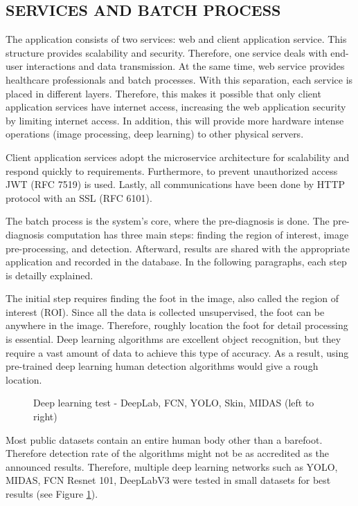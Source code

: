 \subsection{SERVICES AND BATCH PROCESS} \label{sec:StudyIServicesAndBatchProcess}
The application consists of two services: web and client application service. This structure provides scalability and security. Therefore, one service deals with end-user interactions and data transmission. At the same time, web service provides healthcare professionals and batch processes. With this separation, each service is placed in different layers. Therefore, this makes it possible that only client application services have internet access, increasing the web application security by limiting internet access.  In addition, this will provide more hardware intense operations (image processing, deep learning) to other physical servers. 

Client application services adopt the microservice architecture for scalability and respond quickly to requirements. Furthermore, to prevent unauthorized access JWT (RFC 7519) is used. Lastly, all communications have been done by HTTP protocol with an SSL (RFC 6101). 

The batch process is the system's core, where the pre-diagnosis is done. The pre-diagnosis computation has three main steps: finding the region of interest, image pre-processing, and detection. Afterward, results are shared with the appropriate application and recorded in the database. In the following paragraphs, each step is detailly explained.

The initial step requires finding the foot in the image, also called the region of interest (ROI).  Since all the data is collected unsupervised, the foot can be anywhere in the image. Therefore, roughly location the foot for detail processing is essential. Deep learning algorithms are excellent object recognition, but they require a vast amount of data to achieve this type of accuracy. As a result, using pre-trained deep learning human detection algorithms would give a rough location.

\begin{figure}[htbp]
\centering
{}
\caption{Deep learning test - DeepLab, FCN, YOLO, Skin, MIDAS (left to right)}
\label{fig:DeepLearningTest}
\end{figure}

Most public datasets contain an entire human body other than a barefoot. Therefore detection rate of the algorithms might not be as accredited as the announced results. Therefore, multiple deep learning networks such as YOLO, MIDAS, FCN Resnet 101, DeepLabV3 were tested in small datasets for best results (see Figure \ref{fig:DeepLearningTest}).

